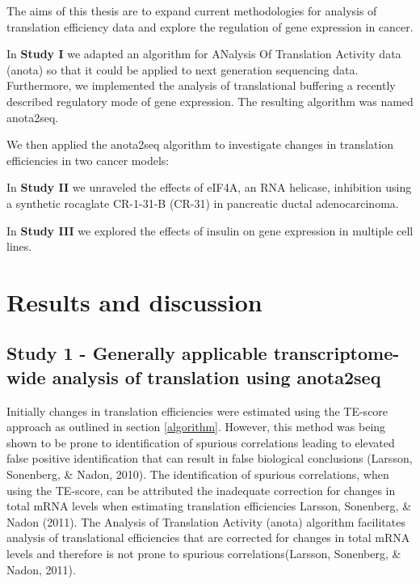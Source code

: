 \documentclass[
  12pt,
  openany]{book}
\begin{document}
The aims of this thesis are to expand current methodologies for analysis of translation efficiency data and explore the regulation of gene expression in cancer.

In \textbf{Study I} we adapted an algorithm for ANalysis Of Translation Activity data (anota) so that it could be applied to next generation sequencing data. Furthermore, we implemented the analysis of translational buffering a recently described regulatory mode of gene expression. The resulting algorithm was named anota2seq.

We then applied the anota2seq algorithm to investigate changes in translation efficiencies in two cancer models:

In \textbf{Study II} we unraveled the effects of eIF4A, an RNA helicase, inhibition using a synthetic rocaglate CR-1-31-B (CR-31) in pancreatic ductal adenocarcinoma.

In \textbf{Study III} we explored the effects of insulin on gene expression in multiple cell lines.

\chapter{Results and discussion}

\section{Study 1 - Generally applicable transcriptome-wide analysis of translation using anota2seq}

Initially changes in translation efficiencies were estimated using the TE-score approach as outlined in section \ref{algorithm}. However, this method was being shown to be prone to identification of spurious correlations leading to elevated false positive identification that can result in false biological conclusions (Larsson, Sonenberg, \& Nadon, 2010). The identification of spurious correlations, when using the TE-score, can be attributed the inadequate correction for changes in total mRNA levels when estimating translation efficiencies Larsson, Sonenberg, \& Nadon (2011). The Analysis of Translation Activity (anota) algorithm facilitates analysis of translational efficiencies that are corrected for changes in total mRNA levels and therefore is not prone to spurious correlations(Larsson, Sonenberg, \& Nadon, 2011).
\end{document}
